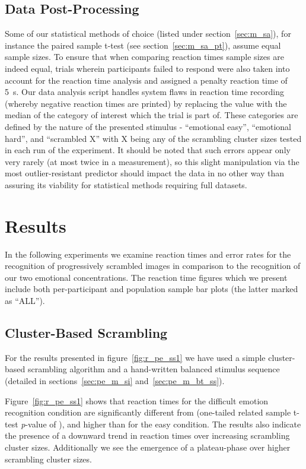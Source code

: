 	\subsection{Data Post-Processing}
	    Some of our statistical methods of choice (listed under section~\ref{sec:m_sa}), for instance the paired sample t-test (see section~\ref{sec:m_sa_pt}), assume equal sample sizes.
	    To ensure that when comparing reaction times sample sizes are indeed equal, trials wherein participants failed to respond were also taken into account for the reaction time analysis and assigned a penalty reaction time of \SI{5}{\second}.
	    Our data analysis script handles system flaws in reaction time recording (whereby negative reaction times are printed) by replacing the value with the median of the category of interest which the trial is part of.
	    These categories are defined by the nature of the presented stimulus - “emotional easy”, “emotional hard”, and “scrambled X” with X being any of the scrambling cluster sizes tested in each run of the experiment.
	    It should be noted that such errors appear only very rarely (at most twice in a measurement), so this slight manipulation via the most outlier-resistant predictor should impact the data in no other way than assuring its viability for statistical methods requiring full datasets.  
    \section{Results}\label{sec:pe_r}
	In the following experiments we examine reaction times and error rates for the recognition of progressively scrambled images in comparison to the recognition of our two emotional concentrations.
	The reaction time figures which we present include both per-participant and population sample bar plots (the latter marked as “ALL”).
	\subsection{Cluster-Based Scrambling}\label{sec:pe_r_ss}
	    For the results presented in figure~\ref{fig:r_pe_ss1} we have used a simple cluster-based scrambling algorithm and a hand-written balanced stimulus sequence 
	    (detailed in sections~\ref{sec:pe_m_si} and~\ref{sec:pe_m_bt_ss}).
	    
	    Figure~\ref{fig:r_pe_ss1} shows that reaction times for the difficult emotion recognition condition are significantly different from (one-tailed related sample t-test \textit{p}-value of 
	    ),
	    and higher than for the easy condition.
	    The results also indicate the presence of a downward trend in reaction times over increasing scrambling cluster sizes.
	    Additionally we see the emergence of a plateau-phase over higher scrambling cluster sizes.
	    

